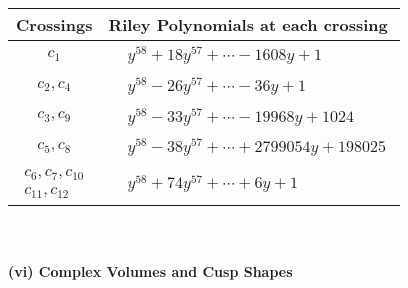 \documentclass[1p]{elsarticle_modified}
\theoremstyle{definition}
\begin{document}
\begin{tabular}{m{50pt}|m{274pt}}
Crossings & \hspace{64pt}Riley Polynomials at each crossing \\
\hline $$\begin{aligned}c_{1}\end{aligned}$$&$\begin{aligned}
&y^{58}+18 y^{57}+\cdots-1608 y+1
\end{aligned}$\\
\hline $$\begin{aligned}c_{2},c_{4}\end{aligned}$$&$\begin{aligned}
&y^{58}-26 y^{57}+\cdots-36 y+1
\end{aligned}$\\
\hline $$\begin{aligned}c_{3},c_{9}\end{aligned}$$&$\begin{aligned}
&y^{58}-33 y^{57}+\cdots-19968 y+1024
\end{aligned}$\\
\hline $$\begin{aligned}c_{5},c_{8}\end{aligned}$$&$\begin{aligned}
&y^{58}-38 y^{57}+\cdots+2799054 y+198025
\end{aligned}$\\
\hline $$\begin{aligned}c_{6},c_{7},c_{10}\\c_{11},c_{12}\end{aligned}$$&$\begin{aligned}
&y^{58}+74 y^{57}+\cdots+6 y+1
\end{aligned}$\\
\hline
\end{tabular}\\~\\
\newpage\flushleft \textbf{(vi) Complex Volumes and Cusp Shapes}
\end{document}
